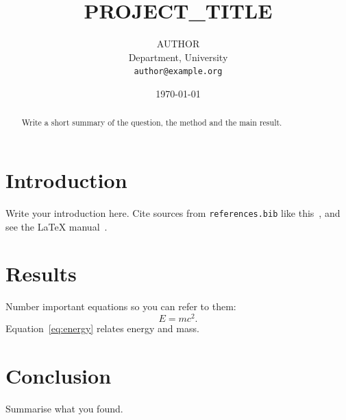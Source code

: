 \documentclass[11pt]{article}
\title{{{PROJECT_TITLE}}}
\author{{{AUTHOR}}\\ \small Department, University \\ \small \texttt{author@example.org}}
\date{\today}
\begin{document}
\maketitle

\begin{abstract}
Write a short summary of the question, the method and the main result.
\end{abstract}

\section{Introduction}
Write your introduction here. Cite sources from \texttt{references.bib} like
this~\cite{einstein1905}, and see the \LaTeX{} manual~\cite{lamport1994}.

\section{Results}
Number important equations so you can refer to them:
\begin{equation}
  E = mc^2 . \label{eq:energy}
\end{equation}
Equation~\eqref{eq:energy} relates energy and mass.

\section{Conclusion}
Summarise what you found.



\end{document}
